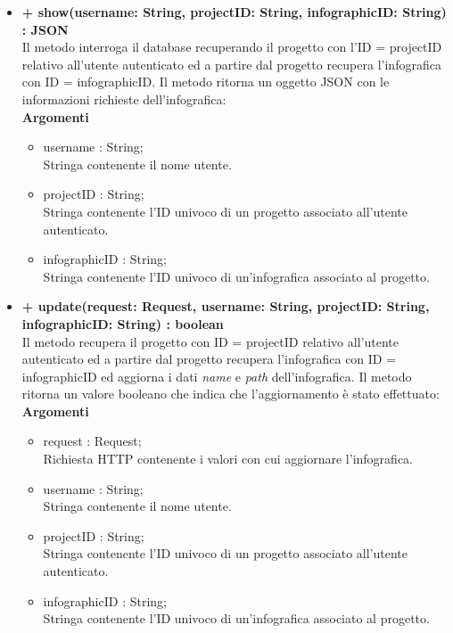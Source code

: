 \begin{itemize}
			\item \textbf{+ show(username: String, projectID: String, infographicID: String) : JSON}\\
			Il metodo interroga il \gls{database} recuperando il progetto con l'ID = projectID relativo all'utente autenticato ed a partire dal progetto recupera l'\gls{infografica} con ID = infographicID. Il metodo ritorna un oggetto \gls{JSON} con le informazioni richieste dell'\gls{infografica}:\\
			\textbf{Argomenti}
			\begin{itemize}
				\item username : String; \\
				Stringa contenente il nome utente.
				\item projectID : String; \\
				Stringa contenente l'ID univoco di un progetto associato all'utente autenticato.
				\item infographicID : String; \\
				Stringa contenente l'ID univoco di un'\gls{infografica} associato al progetto.
			\end{itemize}
			
			\item \textbf{+ update(request: Request, username: String, projectID: String, infographicID: String) : boolean}\\
			Il metodo recupera il progetto con ID = projectID relativo all'utente autenticato ed a partire dal progetto recupera l'\gls{infografica} con ID = infographicID ed aggiorna i dati \textit{name} e \textit{path} dell'\gls{infografica}. Il metodo ritorna un valore booleano che indica che l'aggiornamento è stato effettuato:\\
			\textbf{Argomenti}
			\begin{itemize}
				\item request : Request;\\
				Richiesta HTTP contenente i valori con cui aggiornare l'\gls{infografica}.
				\item username : String; \\
				Stringa contenente il nome utente.
				\item projectID : String; \\
				Stringa contenente l'ID univoco di un progetto associato all'utente autenticato.
				\item infographicID : String; \\
				Stringa contenente l'ID univoco di un'\gls{infografica} associato al progetto.
			\end{itemize}
			

\end{itemize}
